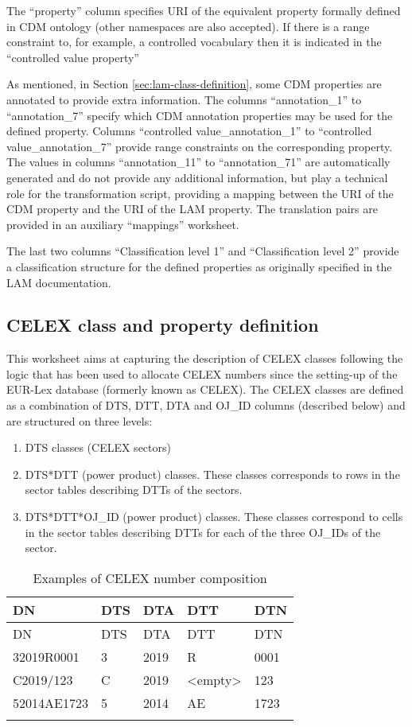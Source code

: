 The ``property'' column specifies URI of the equivalent property formally
defined in CDM ontology (other namespaces are also accepted). If there
is a range constraint to, for example, a controlled vocabulary then it
is indicated in the ``controlled value property'' 

As mentioned, in Section \ref{sec:lam-class-definition}, some CDM properties are annotated to provide
extra information. The columns ``annotation\_1'' to ``annotation\_7'' specify which CDM annotation properties may be used for the defined
property. Columns ``controlled value\_annotation\_1'' to ``controlled
value\_annotation\_7'' provide range constraints on the corresponding
property. The values in columns ``annotation\_11'' to ``annotation\_71'' are
automatically generated and do not provide any additional information,
but play a technical role for the transformation script, providing a
mapping between the URI of the CDM property and the URI of the LAM
property. The translation pairs are provided in an auxiliary ``mappings'' worksheet.

The last two columns ``Classification level 1'' and ``Classification level
2'' provide a classification structure for the defined properties as
originally specified in the LAM documentation.

\subsection{CELEX class and property definition}

This worksheet aims at capturing the description of CELEX classes
following the logic that has been used to allocate CELEX numbers since
the setting-up of the EUR-Lex database (formerly known as CELEX). The
CELEX classes are defined as a combination of DTS, DTT, DTA and OJ\_ID
columns (described below) and are structured on three levels:

\begin{enumerate}
\item
  DTS classes (CELEX sectors)
\item
  DTS*DTT (power product) classes. These classes corresponds to rows in
  the sector tables describing DTTs of the sectors.
\item
  DTS*DTT*OJ\_ID (power product) classes. These classes correspond to
  cells in the sector tables describing DTTs for each of the three
  OJ\_IDs of the sector.
\end{enumerate}

\begin{longtable}[!ht]{@{}p{3.2cm}p{2cm}p{2cm}p{2cm}p{2cm}@{}}
	\toprule
	DN & DTS & DTA & DTT & DTN\tabularnewline
	\midrule
	\endfirsthead
	\toprule
	DN & DTS & DTA & DTT & DTN\tabularnewline
	\midrule
	\endhead
	32019R0001 & 3 & 2019 & R & 0001\tabularnewline
	C2019/123 & C & 2019 & \textless{}empty\textgreater{} &
	123\tabularnewline
	52014AE1723 & 5 & 2014 & AE & 1723\tabularnewline
	\bottomrule
	\caption{Examples of CELEX number composition}
	\label{tab:ex2}
	\vspace{-10pt}
\end{longtable}

